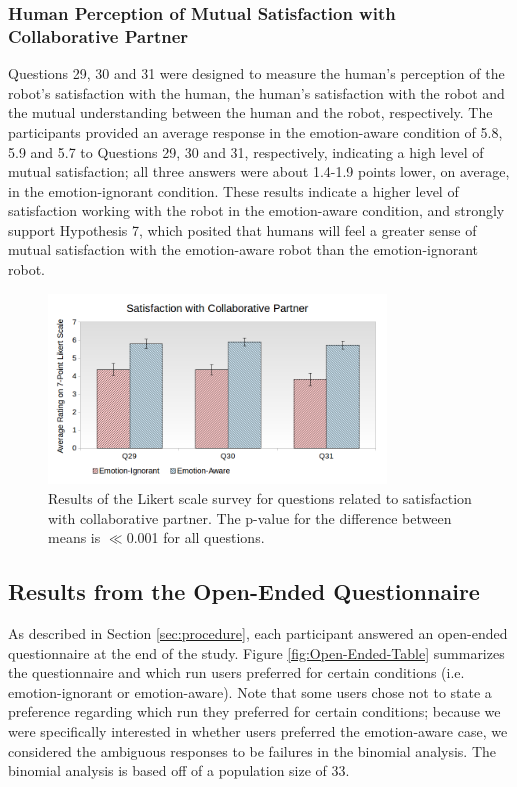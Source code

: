 \documentclass[12pt]{report}
\begin{document}
\subsubsection{Human Perception of Mutual Satisfaction with Collaborative
Partner}
\label{sec:MutualSatisfaction}
Questions 29, 30 and 31 were designed to measure the human's perception
of the robot's satisfaction with the human, the human's satisfaction with the
robot and the mutual understanding between the human and the robot,
respectively. The participants provided an average response in the emotion-aware
condition of 5.8, 5.9 and 5.7 to Questions 29, 30 and 31, respectively,
indicating a high level of mutual satisfaction; all three answers were
about 1.4-1.9 points lower, on average, in the emotion-ignorant condition. These
results indicate a higher level of satisfaction working with the robot in the
emotion-aware condition, and strongly support Hypothesis 7, which posited that
humans will feel a greater sense of mutual satisfaction with the emotion-aware
robot than the emotion-ignorant robot.

\begin{figure}
\centering
\includegraphics[width=0.8\textwidth]{figure/Overall-Satisfaction.png}
\caption{\fontsize{10}{10}\selectfont Results of the Likert scale survey for
questions related to satisfaction with collaborative partner. The p-value for
the difference between means is $\ll$0.001 for all questions.}
\label{fig:overall-satisfaction}
\end{figure}

\subsection{Results from the Open-Ended Questionnaire} 
\label{sec:Open-Ended}
As described in Section \ref{sec:procedure}, each participant answered an open-ended
questionnaire at the end of the study. Figure \ref{fig:Open-Ended-Table}
summarizes the questionnaire and which run users preferred for certain
conditions (i.e. emotion-ignorant or emotion-aware). Note that some users chose
not to state a preference regarding which run they preferred for certain
conditions; because we were specifically interested in whether users preferred
the emotion-aware case, we considered the ambiguous responses to be failures in
the binomial analysis. The binomial analysis is based off of a population size
of 33. 
\end{document}
